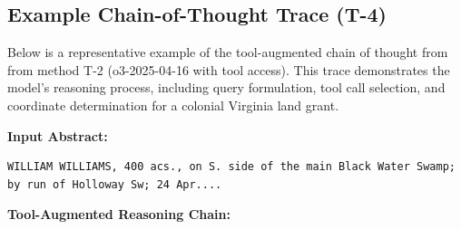 \subsection{Example Chain-of-Thought Trace
(T-4)}\label{app-cot-trace}

Below is a representative example of the tool-augmented chain of thought
from from method T-2 (o3-2025-04-16 with tool access). This trace
demonstrates the model's reasoning process, including query formulation,
tool call selection, and coordinate determination for a colonial
Virginia land grant.

\textbf{Input Abstract:}

\begin{lstlisting}
WILLIAM WILLIAMS, 400 acs., on S. side of the main Black Water Swamp; by run of Holloway Sw; 24 Apr....
\end{lstlisting}

\textbf{Tool-Augmented Reasoning Chain:}

